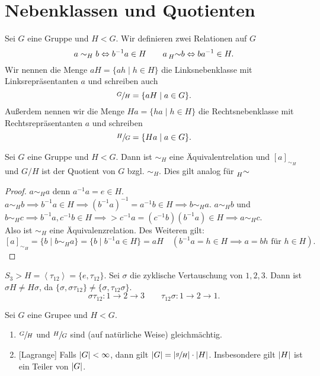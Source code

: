 \section{Nebenklassen und Quotienten}

\begin{definition}
	Sei $G$ eine Gruppe und $H < G$.
	Wir definieren zwei Relationen auf $G$ 
	\[
		a \sim_{H} b \Leftrightarrow b^{-1} a \in H \qquad a \prescript{}{H}{\sim} b \Leftrightarrow b a^{-1} \in H
	.\] 
	Wir nennen die Menge $a H = \{a h \mid h \in H\} $ die Linksnebenklasse mit Linksrepräsentanten $a$ und schreiben auch
	\[
	\sfrac{G}{H} = \{a H \mid a \in G\} 
	.\] 
	Außerdem nennen wir die Menge $H a = \{h a \mid h \in H\} $ die Rechtsnebenklasse mit Rechtsrepräsentanten $a$ und schreiben 
	\[
	\sfrac{H}{G} = \{H a \mid a \in G\} 
	.\] 
\end{definition}

\begin{lemma}
	Sei $G$ eine Gruppe und $H < G$. Dann ist $\sim_{H}$ eine Äquivalentrelation und $[ a ]_{\sim_{H}}$ und $G / H$ ist der Quotient von $G$ bzgl. $\sim_{H}$.
	Dies gilt analog für $\prescript{}{H}{\sim}$
\end{lemma}

\begin{proof}
	$a \sim_{H} a$ denn $a^{-1} a = e \in H$.\\
	$a \sim_{H} b \implies b^{-1} a \in H \implies (b^{-1} a)^{-1} = a^{-1} b \in H \implies b \sim_{H} a$.
	$a \sim_{H} b $ und $b \sim_{H} c \implies b^{-1} a, c^{-1} b \in H \implies> c^{-1} a = (c^{-1} b) (b^{-1} a) \in H \implies a \sim_{H} c$.\\
	Also ist $\sim_{H}$ eine Äquivalenzrelation. Des Weiteren gilt:
	\[
		[ a ]_{\sim_{H}} = \{b \mid b \sim_{H} a \}  = \{b \mid b^{-1} a \in H\} = a H \quad (b^{-1} a = h \in H \implies a = b h \text{ für } h \in H)
	.\] 
\end{proof}

\begin{eg}	
	$S_{3} > H = \left< \tau_{12} \right> = \{e, \tau_{12}\} $. Sei $\sigma$ die zyklische Vertauschung von  $1,2,3$.
	Dann ist  $\sigma H \neq H \sigma$, da $\{\sigma, \sigma \tau_{12}\} \neq \{\sigma, \tau_{12} \sigma\} $.
	\[
	\sigma \tau_{12}: 1 \to 2 \to 3 \qquad \tau_{12} \sigma : 1 \to 2 \to 1
	.\] 
\end{eg}

\begin{theorem}
	Sei $G$ eine Grupee und $H < G$.
	\begin{enumerate}[(1)]
		\item $\sfrac{G}{H}$ und $\sfrac{H}{G}$ sind (auf natürliche Weise) gleichmächtig.
		\item {[Lagrange]} Falls $\abs{G} < \infty$, dann gilt $\abs{G} = \abs{\sfrac{g}{H}} \cdot \abs{H}$.
			Insbesondere gilt $\abs{H}$ ist ein Teiler von $\abs{G}$.
	\end{enumerate}
\end{theorem}

